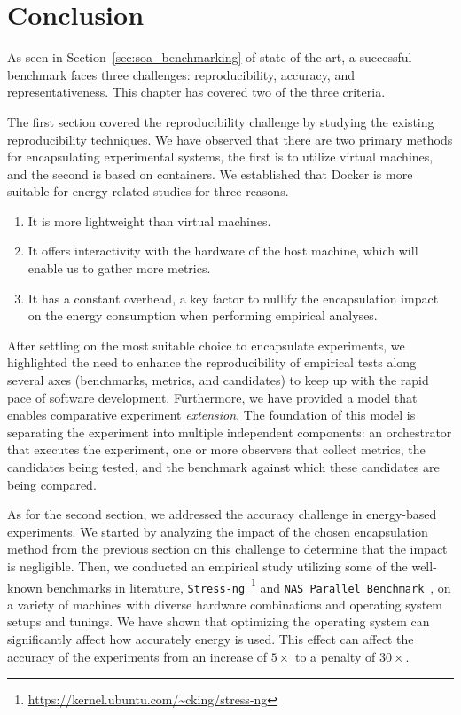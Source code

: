 \section{Conclusion}
As seen in Section~\ref{sec:soa_benchmarking} of state of the art, a successful benchmark faces three challenges: reproducibility, accuracy, and representativeness. 
This chapter has covered two of the three criteria.

The first section covered the reproducibility challenge by studying the existing reproducibility techniques. We have observed that there are two primary methods for encapsulating experimental systems, the first is to utilize virtual machines, and the second is based on containers. We established that Docker is more suitable for energy-related studies for three reasons.

\begin{enumerate}
    \item It is more lightweight than virtual machines.
    \item It offers interactivity with the hardware of the host machine, which will enable us to gather more metrics.
    \item It has a constant overhead, a key factor to nullify the encapsulation impact on the energy consumption when performing empirical analyses.
\end{enumerate}

After settling on the most suitable choice to encapsulate experiments, we highlighted the need to enhance the reproducibility of empirical tests along several axes (benchmarks, metrics, and candidates) to keep up with the rapid pace of software development. 
Furthermore, we have provided a model that enables comparative experiment \emph{extension}.
The foundation of this model is separating the experiment into multiple independent components: an orchestrator that executes the experiment, one or more observers that collect metrics, the candidates being tested, and the benchmark against which these candidates are being compared.

As for the second section, we addressed the accuracy challenge in energy-based experiments.
We started by analyzing the impact of the chosen encapsulation method from the previous section on this challenge to determine that the impact is negligible.
Then, we conducted an empirical study utilizing some of the well-known benchmarks in literature, \texttt{Stress-ng}~\footnote{\url{https://kernel.ubuntu.com/~cking/stress-ng}} and \texttt{NAS Parallel Benchmark}~\cite{Bailey:1991:NPB:125826.125925}, on a variety of machines with diverse hardware combinations and operating system setups and tunings. We have shown that optimizing the operating system can significantly affect how accurately energy is used. This effect can affect the accuracy of the experiments from an increase of $5\times$ to a penalty of $30\times$.

